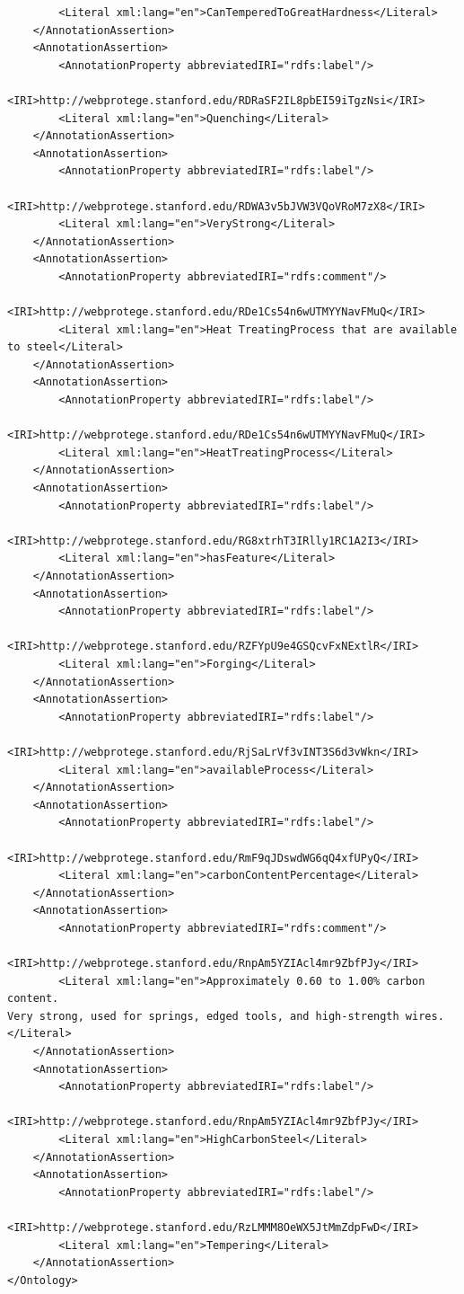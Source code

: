 \documentclass[12pt]{article}
\begin{document}
{\begin{lstlisting}
		<Literal xml:lang="en">CanTemperedToGreatHardness</Literal>
	</AnnotationAssertion>
	<AnnotationAssertion>
		<AnnotationProperty abbreviatedIRI="rdfs:label"/>
		<IRI>http://webprotege.stanford.edu/RDRaSF2IL8pbEI59iTgzNsi</IRI>
		<Literal xml:lang="en">Quenching</Literal>
	</AnnotationAssertion>
	<AnnotationAssertion>
		<AnnotationProperty abbreviatedIRI="rdfs:label"/>
		<IRI>http://webprotege.stanford.edu/RDWA3v5bJVW3VQoVRoM7zX8</IRI>
		<Literal xml:lang="en">VeryStrong</Literal>
	</AnnotationAssertion>
	<AnnotationAssertion>
		<AnnotationProperty abbreviatedIRI="rdfs:comment"/>
		<IRI>http://webprotege.stanford.edu/RDe1Cs54n6wUTMYYNavFMuQ</IRI>
		<Literal xml:lang="en">Heat TreatingProcess that are available to steel</Literal>
	</AnnotationAssertion>
	<AnnotationAssertion>
		<AnnotationProperty abbreviatedIRI="rdfs:label"/>
		<IRI>http://webprotege.stanford.edu/RDe1Cs54n6wUTMYYNavFMuQ</IRI>
		<Literal xml:lang="en">HeatTreatingProcess</Literal>
	</AnnotationAssertion>
	<AnnotationAssertion>
		<AnnotationProperty abbreviatedIRI="rdfs:label"/>
		<IRI>http://webprotege.stanford.edu/RG8xtrhT3IRlly1RC1A2I3</IRI>
		<Literal xml:lang="en">hasFeature</Literal>
	</AnnotationAssertion>
	<AnnotationAssertion>
		<AnnotationProperty abbreviatedIRI="rdfs:label"/>
		<IRI>http://webprotege.stanford.edu/RZFYpU9e4GSQcvFxNExtlR</IRI>
		<Literal xml:lang="en">Forging</Literal>
	</AnnotationAssertion>
	<AnnotationAssertion>
		<AnnotationProperty abbreviatedIRI="rdfs:label"/>
		<IRI>http://webprotege.stanford.edu/RjSaLrVf3vINT3S6d3vWkn</IRI>
		<Literal xml:lang="en">availableProcess</Literal>
	</AnnotationAssertion>
	<AnnotationAssertion>
		<AnnotationProperty abbreviatedIRI="rdfs:label"/>
		<IRI>http://webprotege.stanford.edu/RmF9qJDswdWG6qQ4xfUPyQ</IRI>
		<Literal xml:lang="en">carbonContentPercentage</Literal>
	</AnnotationAssertion>
	<AnnotationAssertion>
		<AnnotationProperty abbreviatedIRI="rdfs:comment"/>
		<IRI>http://webprotege.stanford.edu/RnpAm5YZIAcl4mr9ZbfPJy</IRI>
		<Literal xml:lang="en">Approximately 0.60 to 1.00% carbon content.
Very strong, used for springs, edged tools, and high-strength wires.</Literal>
	</AnnotationAssertion>
	<AnnotationAssertion>
		<AnnotationProperty abbreviatedIRI="rdfs:label"/>
		<IRI>http://webprotege.stanford.edu/RnpAm5YZIAcl4mr9ZbfPJy</IRI>
		<Literal xml:lang="en">HighCarbonSteel</Literal>
	</AnnotationAssertion>
	<AnnotationAssertion>
		<AnnotationProperty abbreviatedIRI="rdfs:label"/>
		<IRI>http://webprotege.stanford.edu/RzLMMM8OeWX5JtMmZdpFwD</IRI>
		<Literal xml:lang="en">Tempering</Literal>
	</AnnotationAssertion>
</Ontology>




\end{lstlisting}}
\end{document}
